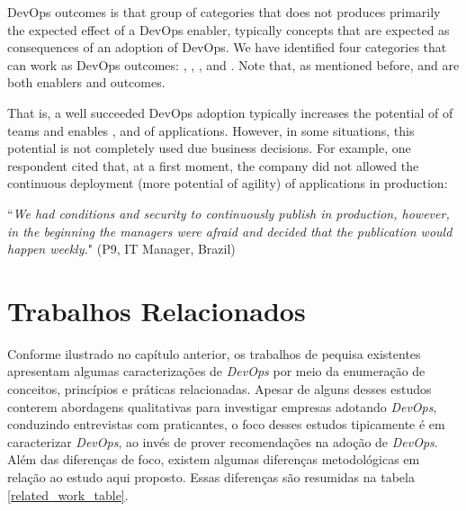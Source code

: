 {%


DevOps outcomes is that group of categories that does not produces primarily the
expected effect of a DevOps enabler, typically concepts that are expected as
consequences of an adoption of DevOps. We have identified four categories that
can work as DevOps outcomes: , ,
, and . Note that,
as mentioned before,  and 
are both enablers and outcomes.

That is, a well succeeded DevOps adoption typically increases the potential of
 of teams and enables ,  and
 of applications.
However, in some situations, this potential is not completely used due business
decisions. For example, one respondent cited that, at a first moment, the
company did not allowed the continuous deployment (more potential of agility)
of applications in production:

\begin{mq}
``\emph{We had conditions and security to continuously publish in production,
however, in the beginning the managers were afraid and decided that the
publication would happen weekly.}" (P9, IT Manager, Brazil)
\end{mq}

\section{Trabalhos Relacionados}

Conforme ilustrado no capítulo anterior, os trabalhos de pequisa existentes
apresentam algumas caracterizações de \textit{DevOps} por meio da enumeração
de conceitos, princípios e práticas relacionadas. Apesar de alguns desses
estudos conterem abordagens qualitativas para investigar empresas adotando
\textit{DevOps}, conduzindo entrevistas com praticantes, o foco desses estudos
tipicamente é em caracterizar \textit{DevOps}, ao invés de prover recomendações
na adoção de \textit{DevOps}. Além das diferenças de foco, existem algumas
diferenças metodológicas em relação ao estudo aqui proposto. Essas diferenças
são resumidas na tabela \ref{related_work_table}.

}
